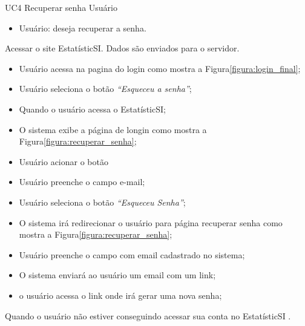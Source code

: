 \casoDeUso
{UC4}
{Recuperar senha}
{Usuário}
{
\begin{itemize}
	\item Usuário: deseja recuperar a senha.	
\end{itemize}

}
{Acessar o site EstatísticSI.}
{Dados são enviados para o servidor.}
{
\begin{itemize}
	\item Usuário acessa na pagina do login como mostra a Figura\ref{figura:login_final}; 
	\item Usuário seleciona o botão \textit{“Esqueceu a senha”};	

\end{itemize}
}
{
\begin{itemize}

	\item Quando o usuário acessa o EstatísticSI;
	\item O sistema exibe a página de longin como mostra a Figura\ref{figura:recuperar_senha};
	\item Usuário acionar o botão  
	\item Usuário preenche o campo  e-mail;
	\item Usuário seleciona o botão    	  \textit{“Esqueceu Senha”};
	\item O sistema irá redirecionar o usuário para página recuperar senha como mostra a Figura\ref{figura:recuperar_senha};
	\item Usuário preenche o campo com email cadastrado no sistema; 
	\item O sistema enviará ao usuário um email com    um link;
	\item o usuário acessa o link onde irá gerar uma nova senha;
	
\end{itemize}
}
{Quando o usuário não estiver conseguindo acessar sua conta no EstatísticSI .}
{

}


